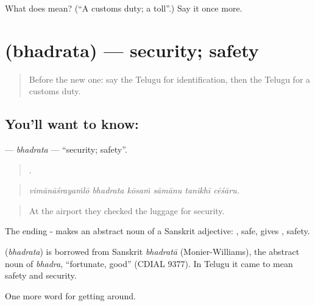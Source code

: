 \begin{tcolorbox}[breakable,colback=teal!4,colframe=teal!35!black,title={Before you move on}]
What does  mean? (\textquotedblleft{}A customs duty; a toll\textquotedblright{}.) Say it once more.
\end{tcolorbox}
\section[\texorpdfstring{\te{భద్రత} (bhadrata)}{భద్రత (bhadrata)}]{ (bhadrata) — security; safety}

\label{lesson:TE-C441-bhadrata}



\begin{quote}
Before the new one: say the Telugu for identification, then the Telugu for a customs duty.
\end{quote}

\subsection*{You'll want to know: }
\textbf{} — \emph{bhadrata} — \textquotedblleft{}security; safety\textquotedblright{}.

\begin{quote}
     .
\end{quote}

\begin{quote}
\emph{vimānāśrayaṁlō bhadrata kōsaṁ sāmānu tanikhī cēśāru.}
\end{quote}

\begin{quote}
At the airport they checked the luggage for security.
\end{quote}

The ending - makes an abstract noun of a Sanskrit adjective: , safe, gives , safety.

\begin{cousinweb}
\textbf{} (\emph{bhadrata}) is borrowed from Sanskrit \emph{bhadratā} (Monier-Williams), the abstract noun of \emph{bhadra}, \textquotedblleft{}fortunate, good\textquotedblright{} (CDIAL 9377). In Telugu it came to mean safety and security.
\end{cousinweb}

\begin{grammarlens}[title={What you've built}]
One more word for getting around.
\end{grammarlens}

